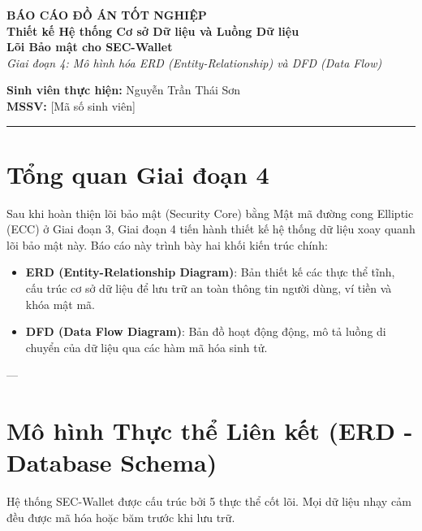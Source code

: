 \documentclass[11pt,a4paper]{article}
\begin{document}
\begin{center}
    \vspace*{1cm}
    \huge \textbf{BÁO CÁO ĐỒ ÁN TỐT NGHIỆP} \\
    \Large \textbf{Thiết kế Hệ thống Cơ sở Dữ liệu và Luồng Dữ liệu \\ Lõi Bảo mật cho SEC-Wallet} \\
    \vspace{0.3cm}
    \textit{Giai đoạn 4: Mô hình hóa ERD (Entity-Relationship) và DFD (Data Flow)} \\
    \vspace{0.4cm}
    
    \small
    \textbf{Sinh viên thực hiện:} Nguyễn Trần Thái Sơn \\
    \textbf{MSSV:} [Mã số sinh viên] \\
    \normalsize
    
    \vspace{0.2cm}
    \rule{\linewidth}{1pt}
\end{center}
\vspace{0.5cm}

\section{Tổng quan Giai đoạn 4}
Sau khi hoàn thiện lõi bảo mật (Security Core) bằng Mật mã đường cong Elliptic (ECC) ở Giai đoạn 3, Giai đoạn 4 tiến hành thiết kế hệ thống dữ liệu xoay quanh lõi bảo mật này. Báo cáo này trình bày hai khối kiến trúc chính:
\begin{itemize}
    \item \textbf{ERD (Entity-Relationship Diagram)}: Bản thiết kế các thực thể tĩnh, cấu trúc cơ sở dữ liệu để lưu trữ an toàn thông tin người dùng, ví tiền và khóa mật mã.
    \item \textbf{DFD (Data Flow Diagram)}: Bản đồ hoạt động động, mô tả luồng di chuyển của dữ liệu qua các hàm mã hóa sinh tử.
\end{itemize}

---

\section{Mô hình Thực thể Liên kết (ERD - Database Schema)}
Hệ thống SEC-Wallet được cấu trúc bởi 5 thực thể cốt lõi. Mọi dữ liệu nhạy cảm đều được mã hóa hoặc băm trước khi lưu trữ.
\end{document}
